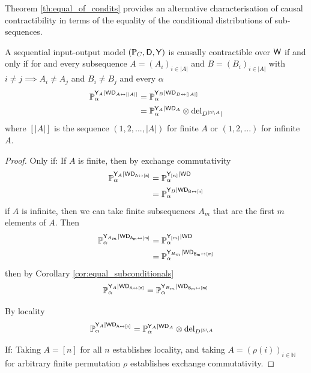 Theorem \ref{th:equal_of_condits} provides an alternative characterisation of causal contractibility in terms of the equality of the conditional distributions of sub-sequences.

\begin{theorem}\label{th:equal_of_condits}
A sequential input-output model $(\mathbb{P}_C,\mathsf{D},\mathsf{Y})$ is causally contractible over $\mathsf{W}$ if and only if for and every subsequence $A=(A_i)_{i\in |A|}$ and $B=(B_i)_{i\in |A|}$ with $i\neq j\implies A_i\neq A_j$ and $B_i\neq B_j$ and every $\alpha$
\begin{align}
    \mathbb{P}_\alpha^{\mathsf{Y}_A|\mathsf{WD}_{A\leftrightarrow [|A|]}} &= \mathbb{P}_\alpha^{\mathsf{Y}_B|\mathsf{WD}_{B\leftrightarrow [|A|]}}\\
    &= \mathbb{P}_\alpha^{\mathsf{Y}_A|\mathsf{WD}_A}\otimes \text{del}_{D^{|\mathbb{N}\setminus A}|}
\end{align}
where $[|A|]$ is the sequence $(1,2,...,|A|)$ for finite $A$ or $(1,2,...)$ for infinite $A$.
\end{theorem}

\begin{proof}
Only if:
If $A$ is finite, then by exchange commutativity
\begin{align}
        \mathbb{P}_\alpha^{\mathsf{Y}_A|\mathsf{WD_{A\leftrightarrow [n]}}} &= \mathbb{P}_\alpha^{\mathsf{Y}_{[n]}|\mathsf{WD}}\\
        &= \mathbb{P}_\alpha^{\mathsf{Y}_B|\mathsf{WD_{B\leftrightarrow [n]}}}
\end{align}
if $A$ is infinite, then we can take finite subsequences $A_m$ that are the first $m$ elements of $A$. Then
\begin{align}
            \mathbb{P}_\alpha^{\mathsf{Y}_{A_m}|\mathsf{WD_{A_m\leftrightarrow [m]}}} &= \mathbb{P}_\alpha^{\mathsf{Y}_{[m]}|\mathsf{WD}}\\
        &= \mathbb{P}_\alpha^{\mathsf{Y}_{B_m}|\mathsf{WD_{B_m\leftrightarrow [m]}}}
\end{align}
then by Corollary \ref{cor:equal_subconditionals}
\begin{align}
\mathbb{P}_\alpha^{\mathsf{Y}_A|\mathsf{WD_{A\leftrightarrow [n]}}}=\mathbb{P}_\alpha^{\mathsf{Y}_{B_m}|\mathsf{WD_{B_m\leftrightarrow [m]}}}
\end{align}

By locality
\begin{align}
    \mathbb{P}_\alpha^{\mathsf{Y}_A|\mathsf{WD_{A\leftrightarrow [n]}}} &= \mathbb{P}_\alpha^{\mathsf{Y}_A|\mathsf{WD}_A}\otimes \text{del}_{D^{|\mathbb{N}\setminus A}}
\end{align}

If:
Taking $A=[n]$ for all $n$ establishes locality, and taking $A=(\rho(i))_{i\in \mathbb{N}}$ for arbitrary finite permutation $\rho$ establishes exchange commutativity.
\end{proof}

